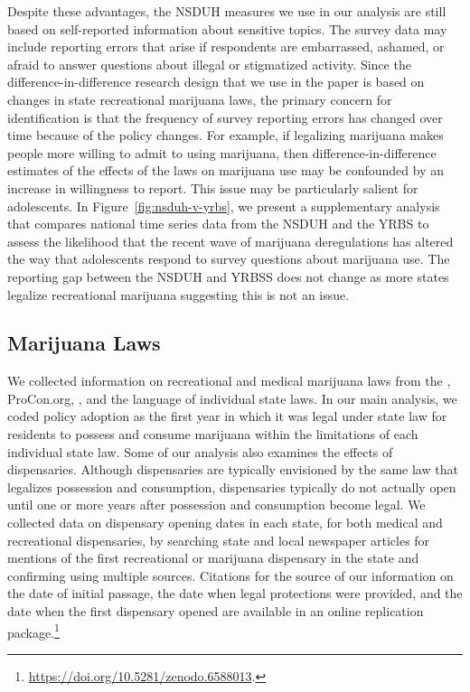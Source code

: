 \documentclass[12pt]{article}%
\begin{document}
Despite these advantages, the NSDUH measures we use in our analysis are still based on self-reported information about sensitive topics. The survey data may include reporting errors that arise if respondents are embarrassed, ashamed, or afraid to answer questions about illegal or stigmatized activity. Since the difference-in-difference research design that we use in the paper is based on changes in state recreational marijuana laws, the primary concern for identification is that the frequency of survey reporting errors has changed over time because of the policy changes. For example, if legalizing marijuana makes people more willing to admit to using marijuana, then difference-in-difference estimates of the effects of the laws on marijuana use may be confounded by an increase in willingness to report.  This issue may be particularly salient for adolescents. In Figure~\ref{fig:nsduh-v-yrbs}, we present a supplementary analysis that compares national time series data from the NSDUH and the YRBS to assess the likelihood that the recent wave of marijuana deregulations has altered the way that adolescents respond to survey questions about marijuana use. The reporting gap between the NSDUH and YRBSS does not change as more states legalize recreational marijuana suggesting this is not an issue.


\subsection{Marijuana Laws }\label{sec:data_laws}

We collected information on recreational and medical marijuana laws from the \cite{NationalAllianceforModelStateDrugLaws2017a,NationalAllianceforModelStateDrugLaws2017}, ProCon.org, \cite{Powell2018}, and the language of individual state laws. In our main analysis, we coded policy adoption as the first year in which it was legal under state law for residents to possess and consume marijuana within the limitations of each individual state law. Some of our analysis also examines the effects of dispensaries. Although dispensaries are typically envisioned by the same law that legalizes possession and consumption, dispensaries typically do not actually open until one or more years after possession and consumption become legal. We collected data on dispensary opening dates in each state, for both medical and recreational dispensaries, by searching state and local newspaper articles for mentions of the first recreational or marijuana dispensary in the state and confirming using multiple sources. Citations for the source of our information on  the date of initial passage, the date when legal protections were provided, and the date when the first dispensary opened are available in an online replication package.\footnote{\url{https://doi.org/10.5281/zenodo.6588013}.}
\end{document}
